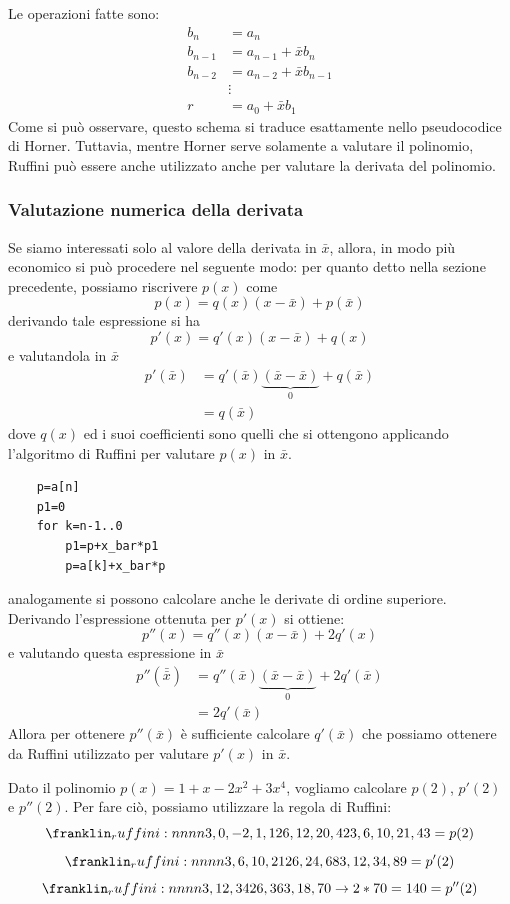 \documentclass{article}
\begin{document}
Le operazioni fatte sono:
\begin{equation*}
   \begin{aligned}
    b_n & = a_n \\
    b_{n-1} & = a_{n-1}+\bar{x}b_n \\
    b_{n-2} & = a_{n-2}+\bar{x}b_{n-1} \\
    & \vdots \\
    r & = a_0+\bar{x}b_1
   \end{aligned} 
\end{equation*}
Come si può osservare, questo schema si traduce esattamente nello pseudocodice
di Horner. Tuttavia, mentre Horner serve solamente a valutare il polinomio,
Ruffini può essere anche utilizzato anche per valutare la derivata del polinomio.
\subsubsection{Valutazione numerica della derivata}
Se siamo interessati solo al valore della derivata in $\bar{x}$, allora, 
in modo più economico si può procedere nel seguente modo: 
per quanto detto nella sezione precedente, possiamo riscrivere
$p(x)$ come
$$p(x)=q(x)(x-\bar{x})+p(\bar{x})$$
derivando tale espressione si ha 
$$p'(x)=q'(x)(x-\bar{x})+q(x)$$
e valutandola in $\bar{x}$
\begin{equation*}
    \begin{aligned}
        p'(\bar{x})&=q'(\bar{x})\underbrace{(\bar{x}-\bar{x})}_{0}+q(\bar{x})\\ 
                   &=q(\bar{x})
    \end{aligned} 
\end{equation*}
dove $q(x)$ ed i suoi coefficienti sono quelli che si ottengono applicando
l'algoritmo di Ruffini per valutare $p(x)$ in $\bar{x}$.
\begin{verbatim}
    p=a[n]
    p1=0
    for k=n-1..0
        p1=p+x_bar*p1
        p=a[k]+x_bar*p
\end{verbatim}
analogamente si possono calcolare anche le derivate di ordine superiore.
Derivando l'espressione ottenuta per $p'(x)$ si ottiene:
$$p''(x)=q''(x)(x-\bar{x})+2q'(x)$$
e valutando questa espressione in $\bar{x}$
\begin{equation*}
   \begin{aligned}
       p''(\bar{\bar{x}})&=q''(\bar{x})\underbrace{(\bar{x}-\bar{x})}_0+2q'(\bar{x})\\
       &=2q'(\bar{x})
   \end{aligned} 
\end{equation*}
Allora per ottenere $p''(\bar{x})$ è sufficiente calcolare $q'(\bar{x})$ che
possiamo ottenere da Ruffini utilizzato per valutare $p'(x)$ in $\bar{x}$.
\begin{example}
    Dato il polinomio $p(x)=1+x-2x^2+3x^4$, vogliamo calcolare $p(2)$, $p'(2)$
    e $p''(2)$.
    Per fare ciò, possiamo utilizzare la regola di Ruffini:
    $$\ruffini{3,0,-2,1,1}{2}{6,12,20,42}{3,6,10,21,43=p(2)}$$
    $$\ruffini{3,6,10,21}{2}{6,24,68}{3,12,34,89=p'(2)}$$
    $$\ruffini{3,12,34}{2}{6,36}{3,18,70\rightarrow 2*70=140=p''(2)}$$
\end{example}
\end{document}
